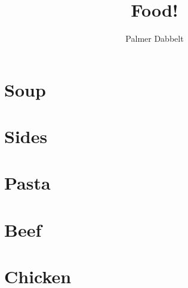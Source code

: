 \documentclass{book}
\author{Palmer Dabbelt}
\title{Food!}
\begin{document}
\maketitle
\tableofcontents
\contentsskip

\newcommand{\maketitle}{}
\renewcommand{\tableofcontents}{}
\newcommand{\author}[1]{}
\newcommand{\title}[1]{}
\renewcommand{\contentsskip}{}
\renewcommand{\bref}[1]{\ref{#1}}

\chapter{Soup}


\chapter{Sides}


\chapter{Pasta}



\chapter{Beef}


\chapter{Chicken}


\end{document}
